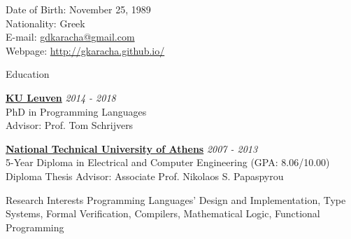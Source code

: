 \documentclass{resume} %
\newcommand{\note}[1]{\begin{color}{red}{#1}\end{color}}
\begin{document}
Date of Birth: \hspace*{\fill} November 25, 1989 \\
Nationality:   \hspace*{\fill} Greek \\
E-mail:        \hspace*{\fill} \href{mailto:gdkaracha@gmail.com}
                                    {gdkaracha@gmail.com} \\
Webpage:       \hspace*{\fill} \href{http://gkaracha.github.io/}
                                    {http://gkaracha.github.io/} \\[-5mm]


\begin{rSection}{Education}

{\bf \href{http://www.kuleuven.be/english}{KU Leuven}} \hfill {\em 2014 - 2018} \\ %
PhD in Programming Languages \\
Advisor: Prof. Tom Schrijvers

{\bf \href{http://www.ntua.gr}{National Technical University of Athens}} \hfill {\em 2007 - 2013} \\
5-Year Diploma in Electrical and Computer Engineering (GPA: 8.06/10.00) \\
Diploma Thesis Advisor: Associate Prof. Nikolaos S. Papaspyrou

\end{rSection}


\begin{rSection}{Research Interests}
Programming Languages' Design and Implementation, Type Systems, Formal
Verification, Compilers, Mathematical Logic, Functional Programming
\end{rSection}

\end{document}
